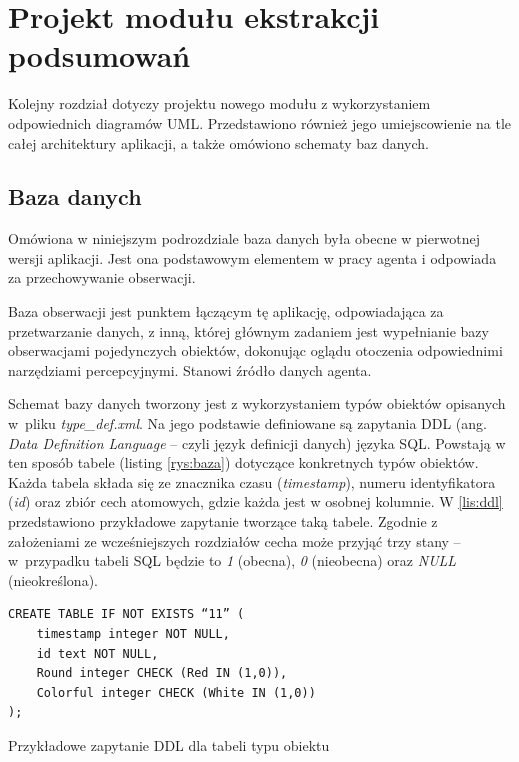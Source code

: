\chapter{Projekt modułu ekstrakcji podsumowań}

Kolejny rozdział dotyczy projektu nowego modułu z wykorzystaniem odpowiednich diagramów UML. Przedstawiono również jego umiejscowienie na tle całej architektury aplikacji, a także omówiono schematy baz danych. 


\section{Baza danych}

Omówiona w niniejszym podrozdziale baza danych była obecne w pierwotnej wersji aplikacji. Jest ona podstawowym elementem w pracy agenta i odpowiada za przechowywanie obserwacji.

Baza obserwacji jest punktem łączącym tę aplikację, odpowiadająca za przetwarzanie danych, z inną, której głównym zadaniem jest wypełnianie bazy obserwacjami pojedynczych obiektów, dokonując oglądu otoczenia odpowiednimi narzędziami percepcyjnymi. Stanowi źródło danych agenta.

Schemat bazy danych tworzony jest z wykorzystaniem typów obiektów opisanych w~pliku \textit{type\_def.xml}. Na jego podstawie definiowane są zapytania DDL (ang. \textit{Data Definition Language} – czyli język definicji danych) języka SQL. Powstają w ten sposób tabele (listing \ref{rys:baza}) dotyczące konkretnych typów obiektów. Każda tabela składa się ze znacznika czasu (\textit{timestamp}), numeru identyfikatora (\textit{id}) oraz zbiór cech atomowych, gdzie każda jest w osobnej kolumnie. W \ref{lis:ddl} przedstawiono przykładowe zapytanie tworzące taką tabele. Zgodnie z założeniami ze wcześniejszych rozdziałów cecha może przyjąć trzy stany -- w~przypadku tabeli SQL będzie to \textit{1} (obecna), \textit{0} (nieobecna) oraz \textit{NULL} (nieokreślona).

\begin{listing}
\begin{verbatim} 
CREATE TABLE IF NOT EXISTS “11” (
	timestamp integer NOT NULL,
	id text NOT NULL,
	Round integer CHECK (Red IN (1,0)),
	Colorful integer CHECK (White IN (1,0))
);
\end{verbatim}
	\caption{Przykładowe zapytanie DDL dla tabeli typu obiektu} 
	\label{lis:ddl}
\end{listing}

